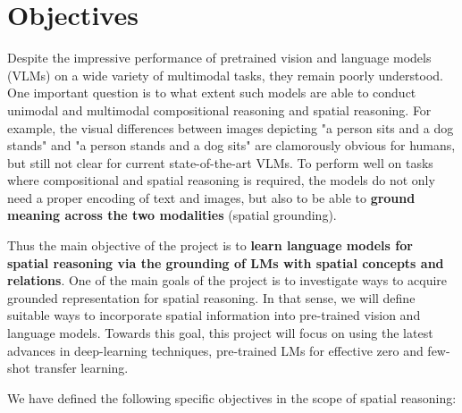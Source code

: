 \section{Objectives}

Despite the impressive performance of pretrained vision and language models (VLMs) on a wide variety of multimodal tasks, they remain poorly understood. One important question is to what extent such models are able to conduct unimodal and multimodal compositional reasoning and spatial reasoning. For example, the visual differences between images depicting "a person sits and a dog stands" and "a person stands and a dog sits" are clamorously obvious for humans, but still not clear for current state-of-the-art VLMs. To perform well on tasks where compositional and spatial reasoning is required, the models do not only need a proper encoding of text and images, but also to be able to \textbf{ground meaning across the two modalities} (spatial grounding).

Thus the main objective of the project is to \textbf{learn language models for spatial reasoning via the grounding of LMs with spatial concepts and relations}. One of the main goals of the project is to investigate ways to acquire grounded representation for spatial reasoning. In that sense, we will define suitable ways to incorporate spatial information into pre-trained vision and language models. Towards this goal, this project will focus on using the latest advances in deep-learning techniques, pre-trained LMs for effective zero and few-shot transfer learning.

We have defined the following specific objectives in the scope of spatial reasoning:

